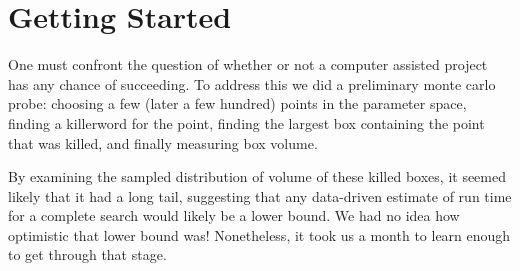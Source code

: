 \section{Getting Started}
One must confront the question of whether or not a computer
assisted project has any chance of succeeding.
To address this we did a preliminary monte carlo probe:
choosing a few (later a few hundred) points in the parameter space,
finding a killerword for the point,
finding the largest box containing the point that was killed,
and finally measuring box volume.

By examining the sampled distribution of volume of these killed boxes,
it seemed likely that it had a long tail,
suggesting that any data-driven estimate of run time for a complete search
would likely be a lower bound.
We had no idea how optimistic that lower bound was!
Nonetheless, it took us a month to learn enough to get through that stage.


